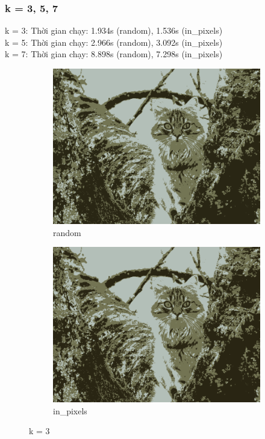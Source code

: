\documentclass{article}
\begin{document}
\subsubsection{k = 3, 5, 7}
k = 3: Thời gian chạy: 1.934s (random), 1.536s (in\_pixels) \\
k = 5: Thời gian chạy: 2.966s (random), 3.092s (in\_pixels)\\
k = 7: Thời gian chạy: 8.898s (random), 7.298s (in\_pixels)
\begin{figure}[h!]
  \begin{subfigure}{.5\textwidth}
    \centering
    \includegraphics[width=.8\linewidth]{image/random_3.png}
    \caption{random}
    \label{fig:sfig1}
  \end{subfigure}%
  \begin{subfigure}{.5\textwidth}
    \centering
    \includegraphics[width=.8\linewidth]{image/in_3.png}
    \caption{in\_pixels}
    \label{fig:sfig2}
  \end{subfigure}
  \caption{k = 3}
  \label{fig:fig}
\end{figure}
\end{document}
